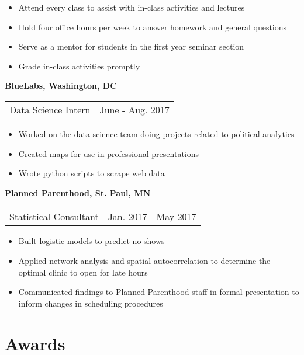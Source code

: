 \begin{itemize}
\setlength\itemsep{0em}
\item Attend every class to assist with in-class activities and lectures 
\item Hold four office hours per week to answer homework and general questions
\item Serve as a mentor for students in the first year seminar section
\item Grade in-class activities promptly
\end{itemize}
{\bf{BlueLabs, Washington, DC}}\\
\begin{tabular}{@{}p{4in}p{2in}}
Data Science Intern & June - Aug. 2017\\
\end{tabular}
\begin{itemize}
\setlength\itemsep{0em}
\item Worked on the data science team doing projects related to political analytics
\item Created maps for use in professional presentations 
\item Wrote python scripts to scrape web data
\end{itemize}
{\bf{Planned Parenthood, St. Paul, MN}}\\
\begin{tabular}{@{}p{4in}p{2in}}
Statistical Consultant & Jan. 2017 - May 2017\\
\end{tabular}
\begin{itemize}
\setlength\itemsep{0em}

\item Built logistic models to predict no-shows
\item Applied network analysis and spatial autocorrelation to determine the optimal clinic to open for late hours
\item Communicated findings to Planned Parenthood staff in formal presentation to inform changes in scheduling procedures
\end{itemize}

\section{\sc Awards}
 \\
 \\
 \\


\endinput